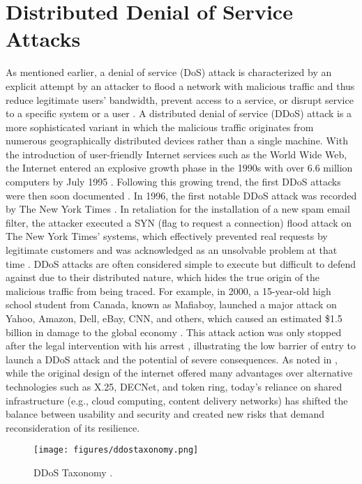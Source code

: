 \section{Distributed Denial of Service Attacks}

As mentioned earlier, a denial of service (DoS) attack is characterized by an explicit attempt by an attacker to flood a network with malicious traffic and thus reduce legitimate users' bandwidth, prevent access to a service, or disrupt service to a specific system or a user \citep{886455}. A distributed denial of service (DDoS) attack is a more sophisticated variant in which the malicious traffic originates from numerous geographically distributed devices rather than a single machine. With the introduction of user-friendly Internet services such as the World Wide Web, the Internet entered an explosive growth phase in the 1990s with over 6.6 million computers by July 1995 \citep{GLOWNIAK1998135}. Following this growing trend, the first DDoS attacks were then soon documented \citep{9404833}. In 1996, the first notable DDoS attack was recorded by The New York Times \citep{nyt-ddos}. In retaliation for the installation of a new spam email filter, the attacker executed a SYN (flag to request a connection) flood attack on The New York Times' systems, which effectively prevented real requests by legitimate customers and was acknowledged as an unsolvable problem at that time \citep{nyt-ddos}. DDoS attacks are often considered simple to execute but difficult to defend against due to their distributed nature, which hides the true origin of the malicious traffic from being traced. For example, in 2000, a 15-year-old high school student from Canada, known as Mafiaboy, launched a major attack on Yahoo, Amazon, Dell, eBay, CNN, and others, which caused an estimated \$1.5 billion in damage to the global economy \citep{9404833}. This attack action was only stopped after the legal intervention with his arrest \citep{mafiaboy}, illustrating the low barrier of entry to launch a DDoS attack and the potential of severe consequences. As noted in \cite{9404833}, while the original design of the internet offered many advantages over alternative technologies such as X.25, DECNet, and token ring, today’s reliance on shared infrastructure (e.g., cloud computing, content delivery networks) has shifted the balance between usability and security and created new risks that demand reconsideration of its resilience.

\begin{figure}[h]
    \centering
    \texttt{[image: figures/ddostaxonomy.png]}
    \caption{DDoS Taxonomy \citep{8888419}.}
    \label{fig:ddos_taxonomies}
\end{figure}

